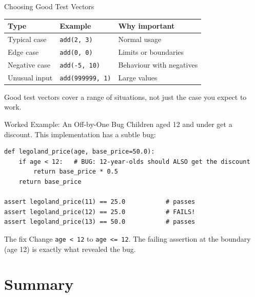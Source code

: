 \documentclass[9pt,aspectratio=169,xcolor=table]{beamer}
\newcommand{\striped}{\rowcolors{1}{white}{stripe}}
\begin{document}
\begin{frame}{Choosing Good Test Vectors}
    \leavevmode
    \small
    \striped
    \begin{center}
    \begin{tabular}{p{2.6cm}p{3.0cm}p{3.6cm}}
        \toprule
        \textbf{Type} & \textbf{Example} & \textbf{Why important} \\
        \midrule
        Typical case & \texttt{add(2, 3)} & Normal usage \\
        Edge case & \texttt{add(0, 0)} & Limits or boundaries \\
        Negative case & \texttt{add(-5, 10)} & Behaviour with negatives \\
        Unusual input & \texttt{add(999999, 1)} & Large values \\
        \bottomrule
    \end{tabular}
    \end{center}

    \vspace{3mm}
    {\small Good test vectors cover a \alert{range} of situations, not
    just the case you expect to work.}
\end{frame}

\begin{frame}[fragile]{Worked Example: An Off-by-One Bug}
    \leavevmode
    Children aged 12 and under get a discount. This implementation has
    a subtle bug:

\begin{lstlisting}
def legoland_price(age, base_price=50.0):
    if age < 12:   # BUG: 12-year-olds should ALSO get the discount
        return base_price * 0.5
    return base_price

assert legoland_price(11) == 25.0           # passes
assert legoland_price(12) == 25.0           # FAILS!
assert legoland_price(13) == 50.0           # passes
\end{lstlisting}

    \vspace{1mm}
    \begin{alertblock}{The fix}
        Change \texttt{age < 12} to \texttt{age <= 12}. The failing
        assertion at the \alert{boundary} (age 12) is exactly what
        revealed the bug.
    \end{alertblock}
\end{frame}

\section{Summary}
\end{document}
